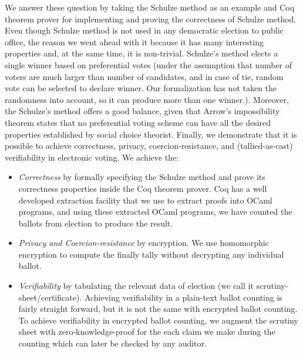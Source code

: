 \noindent
We answer these question by taking the Schulze method \citep{Schulze:2011:NMC} 
as an example and Coq \citep{Bertot:2004:ITP}
theorem prover  for implementing and proving the correctness of  Schulze method.
Even though Schulze method is not used in any democratic election to public office, the reason 
 we went ahead with it because it has many interesting properties and, 
 at the same time, it is non-trivial.   Schulze's method elects  a single winner based on 
preferential votes (under the assumption that number of voters are much larger than number of candidates, 
and in case of tie, random vote can be selected to declare winner.  Our formalization 
has not taken the randomness into account, so it can produce more than one winner.).
Moreover, the Schulze's method offers a good balance, given that 
Arrow's impossibility theorem \citep{Arrow:1950:DCS} states
 that no preferential voting 
scheme can have all the desired properties established by  social choice theorist.
Finally, we demonstrate that it is possible to achieve correctness, privacy, coercion-resistance, and (tallied-as-cast) verifiability in 
electronic voting. We achieve the:
\begin{itemize}
 \item \textit{Correctness} by formally specifying the Schulze method  and prove its correctness properties
  inside the Coq theorem prover. 
 Coq has a well developed extraction facility that 
 we use to extract proofs into OCaml programs, and using these extracted OCaml programs, we 
 have counted the ballots from election to produce the result. 
 \item \textit{Privacy and Coercion-resistance} by encryption. We use homomorphic encryption to compute the 
  finally tally without decrypting any individual ballot. 
\item \textit{Verifiability} by tabulating the relevant data of election (we call it scrutiny-sheet/certificate).
   Achieving verifiability in a plain-text ballot counting is fairly straight forward, but it is not 
   the same with encrypted ballot counting.  To achieve verifiability in encrypted ballot counting, 
   we augment the scrutiny sheet with zero-knowledge-proof for the each claim we make during the 
   counting which can  later be checked by any auditor.  
\end{itemize}





